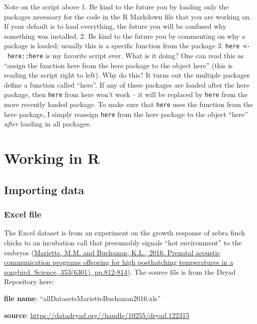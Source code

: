 \documentclass[]{book}
\begin{document}
Note on the script above
1. Be kind to the future you by loading only the packages necessary for the code in the R Markdown file that you are working on. If your default is to load everything, the future you will be confused why something was installed.
2. Be kind to the future you by commenting on why a package is loaded; usually this is a specific function from the package
3. \texttt{here\ \textless{}-\ here::here} is my favorite script ever. What is it doing? One can read this as ``assign the function here from the here package to the object here'' (this is reading the script right to left). Why do this? It turns out the multiple packages define a function called ``here''. If any of these packages are loaded after the here package, then \texttt{here} from here won't work -- it will be replaced by \texttt{here} from the more recently loaded package. To make sure that \texttt{here} uses the function from the here package, I simply reassign \texttt{here} from the here package to the object ``here'' \emph{after} loading in all packages.

\hypertarget{data-working-in-r}{%
\section{Working in R}\label{data-working-in-r}}

\hypertarget{importing-data}{%
\subsection{Importing data}\label{importing-data}}

\hypertarget{excel-file}{%
\subsubsection{Excel file}\label{excel-file}}

The Excel dataset is from an experiment on the growth response of zebra finch chicks to an incubation call that presumably signals ``hot environment'' to the embryos (\href{http://science.sciencemag.org/content/353/6301/812}{Mariette, M.M. and Buchanan, K.L., 2016. Prenatal acoustic communication programs offspring for high posthatching temperatures in a songbird. Science, 353(6301), pp.812-814}). The source file is from the Dryad Repository here:

\textbf{file name}: ``allDatasetsMarietteBuchanan2016.xls''

\textbf{source}: \url{https://datadryad.org//handle/10255/dryad.122315}
\end{document}
